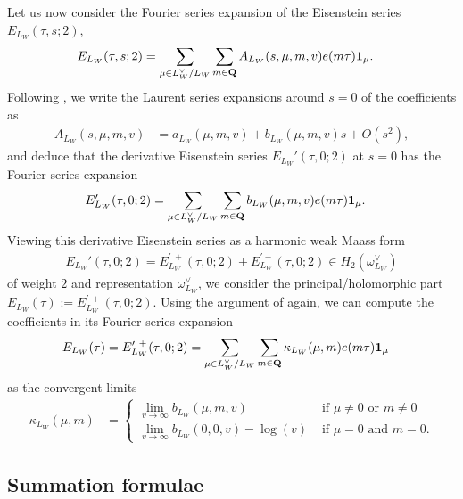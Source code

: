 \documentclass{amsart}
\theoremstyle{definition}
\theoremstyle{definition}
\theoremstyle{definition}
\begin{document}
Let us now consider the Fourier series expansion of the Eisenstein series $E_{L_W}(\tau, s; 2)$, 
\begin{align*} E_{L_W}(\tau, s; 2) &= \sum\limits_{ \mu \in L_W^{\vee}/L_W } \sum\limits_{ m \in {\bf{Q}} } A_{L_W}(s, \mu, m, v) e(m \tau) {\bf{1}}_{\mu}. \end{align*}
Following \cite[Theorem 2.12]{KuBF}, we write the Laurent series expansions around $s=0$ of the coefficients as 
\begin{align*} A_{L_W}(s, \mu, m, v) &= a_{L_W}(\mu, m, v) + b_{L_W}(\mu, m, v) s + O(s^2),\end{align*}
and deduce that the derivative Eisenstein series $E_{L_W}'(\tau, 0; 2)$ at $s=0$ has the Fourier series expansion 
\begin{align*} E_{L_W}'(\tau, 0; 2) &= \sum\limits_{ \mu \in L_W^{\vee}/L_W } \sum\limits_{ m \in {\bf{Q}} } b_{L_W}(\mu, m, v) e(m \tau) {\bf{1}}_{\mu}. \end{align*}
Viewing this derivative Eisenstein series as a harmonic weak Maass form
\begin{align*} E_{L_W}'(\tau, 0; 2) = E_{L_W}^{\prime ~ + }(\tau, 0; 2) + E_{L_W}^{\prime  -}(\tau, 0; 2) \in H_2(\omega_{L_W}^{\vee}) \end{align*}
of weight $2$ and representation $\omega_{L_W}^{\vee}$, 
we consider the principal/holomorphic part $E_{L_W}(\tau) := E_{L_W}^{\prime ~ +}(\tau, 0;2)$.
Using the argument of \cite[Theorem 2.12]{KuBF} again, we can compute the coefficients in its Fourier series expansion 
\begin{align}\label{E+geo} E_{L_W}(\tau) = E_{L_W}^{\prime ~ +}(\tau, 0;2) 
&= \sum\limits_{\mu \in L_W^{\vee}/L_W} \sum\limits_{ m \in {\bf{Q}} } \kappa_{L_W}(\mu, m) e(m \tau) {\bf{1}}_{\mu} \end{align}
as the convergent limits
\begin{align*} \kappa_{L_W}(\mu, m) &= \begin{cases} \lim_{v \rightarrow \infty} b_{L_W}(\mu, m, v) &\text{ if $\mu \neq 0$ or $m \neq 0$} \\
\lim_{v \rightarrow \infty} b_{L_W}(0, 0, v) - \log(v) &\text{ if $\mu=0$ and $m=0$}. \end{cases} \end{align*}

\subsection{Summation formulae}
\end{document}
